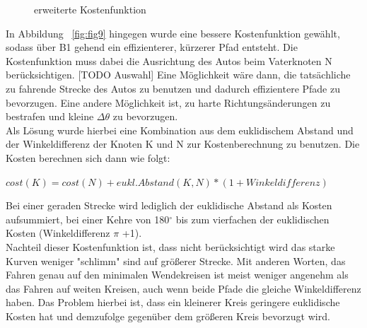 \begin{figure}[htb]
\begin{minipage}[t]{0.45\linewidth}
        \caption{erweiterte Kostenfunktion}
    \end{minipage}
\end{figure}


In Abbildung ~\ref{fig:fig9} hingegen wurde eine bessere Kostenfunktion gewählt, sodass über B1 gehend ein effizienterer, kürzerer Pfad entsteht. Die Kostenfunktion muss dabei die Ausrichtung des Autos beim Vaterknoten N berücksichtigen. [TODO Auswahl] Eine Möglichkeit wäre dann, die tatsächliche zu fahrende Strecke des Autos zu benutzen und dadurch effizientere Pfade zu bevorzugen. Eine andere Möglichkeit ist, zu harte Richtungsänderungen zu bestrafen und kleine $ \Delta \theta$ zu bevorzugen. \\
Als Lösung wurde hierbei eine Kombination aus dem euklidischem Abstand und der Winkeldifferenz der Knoten K und N zur Kostenberechnung zu benutzen. Die Kosten berechnen sich dann wie folgt: 
\begin{center}
$cost(K) = cost(N) +eukl. Abstand(K,N) * (1+Winkeldifferenz)$
\end{center} 
Bei einer geraden Strecke wird lediglich der euklidische Abstand als Kosten aufsummiert, bei einer Kehre von 180$^{\circ}$ bis zum vierfachen der euklidischen Kosten (Winkeldifferenz $\pi$ +1).\\
Nachteil dieser Kostenfunktion ist, dass nicht berücksichtigt wird das starke Kurven weniger "schlimm" sind auf größerer Strecke. Mit anderen Worten, das Fahren genau auf den minimalen Wendekreisen ist meist weniger angenehm als das Fahren auf weiten Kreisen, auch wenn beide Pfade die gleiche Winkeldifferenz haben. Das Problem hierbei ist, dass ein kleinerer Kreis geringere euklidische Kosten hat und demzufolge gegenüber dem größeren Kreis bevorzugt wird.
